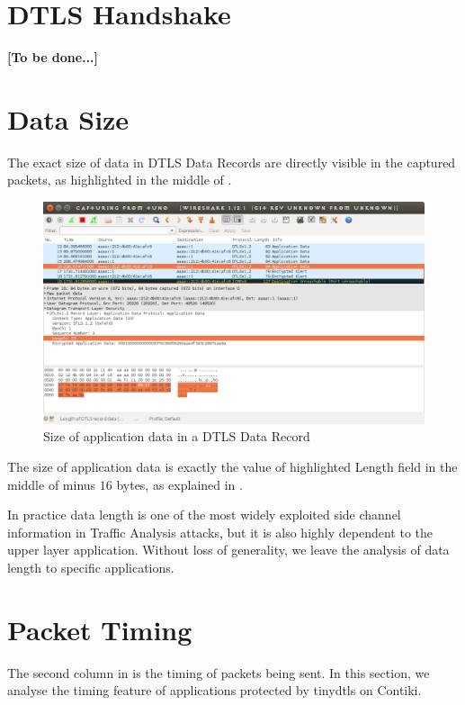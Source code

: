 \section{DTLS Handshake}

\textbf{[To be done...]}

\section{Data Size}

The exact size of data in DTLS Data Records are directly visible in the captured packets, as highlighted in the middle of .

\begin{figure}[ht!]
	\center
	\includegraphics[width=.9\linewidth]{fig/dtlslength.png}
	\caption{Size of application data in a DTLS Data Record}
	\label{Fig: Size of application data in a DTLS Data Record}
\end{figure}

The size of application data is exactly the value of highlighted Length field in the middle of  minus $16$ bytes, as explained in \cite{rfc5116}.

In practice data length is one of the most widely exploited side channel information in Traffic Analysis attacks, but it is also highly dependent to the upper layer application. Without loss of generality, we leave the analysis of data length to specific applications.

\section{Packet Timing}

The second column in  is the timing of packets being sent. In this section, we analyse the timing feature of applications protected by tinydtls on Contiki.


